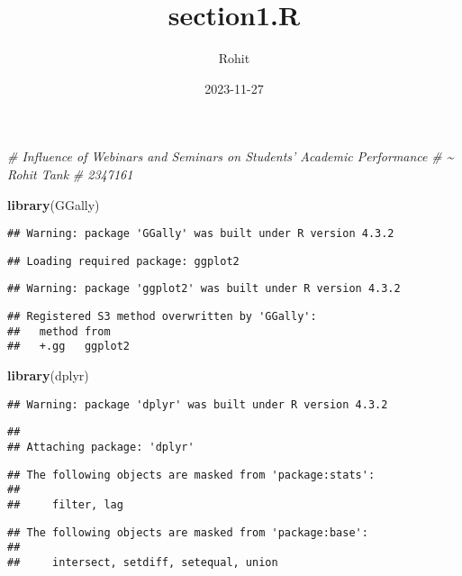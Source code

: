 \documentclass[
]{article}
\title{section1.R}
\author{Rohit}
\date{2023-11-27}
\newenvironment{Shaded}{\begin{snugshade}}{\end{snugshade}}
\newcommand{\CommentTok}[1]{\textcolor[rgb]{0.56,0.35,0.01}{\textit{#1}}}
\newcommand{\FunctionTok}[1]{\textcolor[rgb]{0.13,0.29,0.53}{\textbf{#1}}}
\newcommand{\NormalTok}[1]{#1}
\begin{document}
\maketitle

\begin{Shaded}
\begin{Highlighting}[]
\CommentTok{\# Influence of Webinars and Seminars on Students’ Academic Performance}
\CommentTok{\# \textasciitilde{} Rohit Tank}
\CommentTok{\# 2347161}

\FunctionTok{library}\NormalTok{(GGally)}
\end{Highlighting}
\end{Shaded}

\begin{verbatim}
## Warning: package 'GGally' was built under R version 4.3.2
\end{verbatim}

\begin{verbatim}
## Loading required package: ggplot2
\end{verbatim}

\begin{verbatim}
## Warning: package 'ggplot2' was built under R version 4.3.2
\end{verbatim}

\begin{verbatim}
## Registered S3 method overwritten by 'GGally':
##   method from   
##   +.gg   ggplot2
\end{verbatim}

\begin{Shaded}
\begin{Highlighting}[]
\FunctionTok{library}\NormalTok{(dplyr)}
\end{Highlighting}
\end{Shaded}

\begin{verbatim}
## Warning: package 'dplyr' was built under R version 4.3.2
\end{verbatim}

\begin{verbatim}
## 
## Attaching package: 'dplyr'
\end{verbatim}

\begin{verbatim}
## The following objects are masked from 'package:stats':
## 
##     filter, lag
\end{verbatim}

\begin{verbatim}
## The following objects are masked from 'package:base':
## 
##     intersect, setdiff, setequal, union
\end{verbatim}
\end{document}
